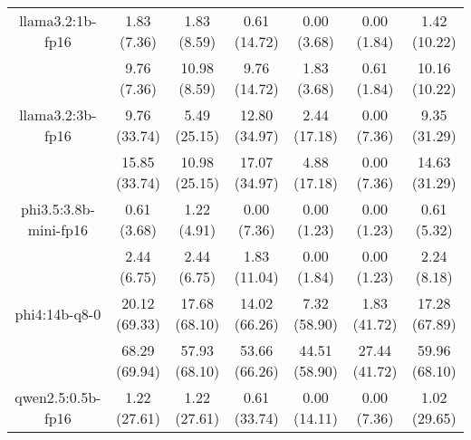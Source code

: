 \begin{table}[]
{\begin{tabular}{ccccccc}
        \multicolumn{1}{c|}{llama3.2:1b-fp16} & 1.83 (7.36) & 1.83 (8.59) & \multicolumn{1}{c|}{0.61 (14.72)} & 0.00 (3.68) & \multicolumn{1}{c|}{0.00 (1.84)} & 1.42 (10.22) \\
        
        

        \multicolumn{1}{c|}{} & 9.76 (7.36) & 10.98 (8.59) & \multicolumn{1}{c|}{9.76 (14.72)} & 1.83 (3.68) & \multicolumn{1}{c|}{0.61 (1.84)} & 10.16 (10.22) \\
        \cline{1-7}
        

        \multicolumn{1}{c|}{llama3.2:3b-fp16} & 9.76 (33.74) & 5.49 (25.15) & \multicolumn{1}{c|}{12.80 (34.97)} & 2.44 (17.18) & \multicolumn{1}{c|}{0.00 (7.36)} & 9.35 (31.29) \\
        
        

        \multicolumn{1}{c|}{} & 15.85 (33.74) & 10.98 (25.15) & \multicolumn{1}{c|}{17.07 (34.97)} & 4.88 (17.18) & \multicolumn{1}{c|}{0.00 (7.36)} & 14.63 (31.29) \\
        \cline{1-7}
        

        \multicolumn{1}{c|}{phi3.5:3.8b-mini-fp16} & 0.61 (3.68) & 1.22 (4.91) & \multicolumn{1}{c|}{0.00 (7.36)} & 0.00 (1.23) & \multicolumn{1}{c|}{0.00 (1.23)} & 0.61 (5.32) \\
        
        

        \multicolumn{1}{c|}{} & 2.44 (6.75) & 2.44 (6.75) & \multicolumn{1}{c|}{1.83 (11.04)} & 0.00 (1.84) & \multicolumn{1}{c|}{0.00 (1.23)} & 2.24 (8.18) \\
        \cline{1-7}
        

        \multicolumn{1}{c|}{phi4:14b-q8-0} & 20.12 (69.33) & 17.68 (68.10) & \multicolumn{1}{c|}{14.02 (66.26)} & 7.32 (58.90) & \multicolumn{1}{c|}{1.83 (41.72)} & 17.28 (67.89) \\
        
        

        \multicolumn{1}{c|}{} & 68.29 (69.94) & 57.93 (68.10) & \multicolumn{1}{c|}{53.66 (66.26)} & 44.51 (58.90) & \multicolumn{1}{c|}{27.44 (41.72)} & 59.96 (68.10) \\
        \cline{1-7}
        

        \multicolumn{1}{c|}{qwen2.5:0.5b-fp16} & 1.22 (27.61) & 1.22 (27.61) & \multicolumn{1}{c|}{0.61 (33.74)} & 0.00 (14.11) & \multicolumn{1}{c|}{0.00 (7.36)} & 1.02 (29.65) \\
        

\end{tabular}}
\end{table}
